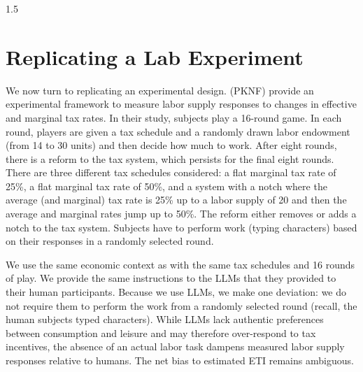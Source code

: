 \documentclass[letterpaper,9pt]{article}
\theoremstyle{definition}
\begin{document}
\begin{spacing}{1.5}
\section{Replicating a Lab Experiment}
\label{sec:Lab}

We now turn to replicating an experimental design. \cite{PKNF2024} (PKNF) provide an experimental framework to measure labor supply responses to changes in effective and marginal tax rates. In their study, subjects play a 16-round game. In each round, players are given a tax schedule and a randomly drawn labor endowment (from 14 to 30 units) and then decide how much to work. After eight rounds, there is a reform to the tax system, which persists for the final eight rounds.  There are three different tax schedules considered: a flat marginal tax rate of 25\%, a flat marginal tax rate of 50\%, and a system with a notch where the average (and marginal) tax rate is 25\% up to a labor supply of 20 and then the average and marginal rates jump up to 50\%.  The reform either removes or adds a notch to the tax system. Subjects have to perform work (typing characters) based on their responses in a randomly selected round.

We use the same economic context as \cite{PKNF2024} with the same tax schedules and 16 rounds of play. We provide the same instructions to the LLMs that they provided to their human participants. Because we use LLMs, we make one deviation: we do not require them to perform the work from a randomly selected round (recall, the human subjects typed characters). While LLMs lack authentic preferences between consumption and leisure and may therefore over-respond to tax incentives, the absence of an actual labor task dampens measured labor supply responses relative to humans. The net bias to estimated ETI remains ambiguous.


\end{spacing}
\end{document}
